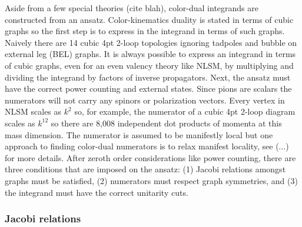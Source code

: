\documentclass[11pt,letter]{article}
\begin{document}
Aside from a few special theories (cite blah), color-dual integrands are constructed from an ansatz.
Color-kinematics duality is stated in terms of cubic graphs so the first step is to express in the integrand in terms of such graphs.
Naively there are 14 cubic 4pt 2-loop topologies ignoring tadpoles and bubble on external leg (BEL) graphs.
It is always possible to express an integrand in terms of cubic graphs, even for an even valency theory like NLSM, by multiplying and dividing the integrand by factors of inverse propagators.
Next, the ansatz must have the correct power counting and external states.
Since pions are scalars the numerators will not carry any spinors or polarization vectors.
Every vertex in NLSM scales as $k^2$ so, for example, the numerator of a cubic 4pt 2-loop diagram scales as $k^{12}$ so there are 8,008 independent dot products of momenta at this mass dimension.
The numerator is assumed to be manifestly local but one approach to finding color-dual numerators is to relax manifest locality, see (...) for more details.
After zeroth order considerations like power counting, there are three conditions that are imposed on the ansatz: (1) Jacobi relations amongst graphs must be satisfied, (2) numerators must respect graph symmetries, and (3) the integrand must have the correct unitarity cuts.

\subsubsection{Jacobi relations}
\end{document}
